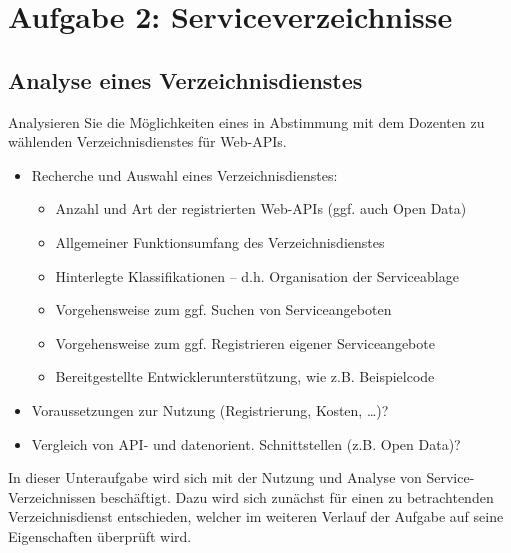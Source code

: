 \documentclass[notitlepage, hidelinks]{article}
\begin{document}
\newpage

\section{Aufgabe 2: Serviceverzeichnisse}
\subsection{Analyse eines Verzeichnisdienstes}
Analysieren Sie die Möglichkeiten eines in Abstimmung mit dem Dozenten zu wählenden Verzeichnisdienstes für Web-APIs.
\begin{itemize}
\item Recherche und Auswahl eines Verzeichnisdienstes:
\begin{itemize}
\item Anzahl und Art der registrierten Web-APIs (ggf. auch Open Data)
\item Allgemeiner Funktionsumfang des Verzeichnisdienstes
\item Hinterlegte Klassifikationen – d.h. Organisation der Serviceablage
\item Vorgehensweise zum ggf. Suchen von Serviceangeboten
\item Vorgehensweise zum ggf. Registrieren eigener Serviceangebote
\item Bereitgestellte Entwicklerunterstützung, wie z.B. Beispielcode
\end{itemize}
\item Voraussetzungen zur Nutzung (Registrierung, Kosten, …)?
\item Vergleich von API- und datenorient. Schnittstellen (z.B. Open Data)?
\end{itemize}

In dieser Unteraufgabe wird sich mit der Nutzung und Analyse von Service-Verzeichnissen beschäftigt. Dazu wird sich zunächst für einen zu betrachtenden Verzeichnisdienst entschieden, welcher im weiteren Verlauf der Aufgabe auf seine Eigenschaften überprüft wird.
\end{document}
